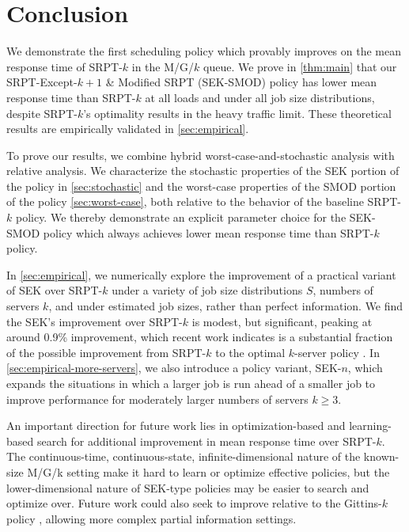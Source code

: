 \documentclass[acmsmall]{acmart}
\begin{document}
\section{Conclusion}

We demonstrate the first scheduling policy which provably improves
on the mean response time of SRPT-$k$ in the M/G/$k$ queue.
We prove in \cref{thm:main} that our SRPT-Except-$k+1$ \& Modified SRPT (SEK-SMOD) policy has lower mean response time than SRPT-$k$ at all loads and under all job size distributions,
despite SRPT-$k$'s optimality results in the heavy traffic limit.
These theoretical results are empirically validated in \cref{sec:empirical}.

To prove our results,
we combine hybrid worst-case-and-stochastic analysis with relative analysis.
We characterize the stochastic properties of the SEK portion of the policy in \cref{sec:stochastic}
and the worst-case properties of the SMOD portion of the policy \cref{sec:worst-case},
both relative to the behavior of the baseline SRPT-$k$ policy.
We thereby demonstrate an explicit parameter choice for the SEK-SMOD policy
which always achieves lower mean response time than SRPT-$k$ policy.

In \cref{sec:empirical}, we numerically explore the improvement of a practical variant of SEK over SRPT-$k$
under a variety of job size distributions $S$, numbers of servers $k$,
and under estimated job sizes, rather than perfect information.
We find the SEK's improvement over SRPT-$k$ is modest, but significant, peaking at around 0.9\% improvement,
which recent work indicates is a substantial fraction of the possible improvement from SRPT-$k$ to the optimal $k$-server policy \cite{wang-et-al2025novel}.
In \cref{sec:empirical-more-servers}, we also introduce a policy variant, SEK-$n$, which expands the situations in which a larger job is run ahead of a smaller job to improve performance for moderately larger numbers of servers $k \ge 3$.

An important direction for future work lies in optimization-based and learning-based search for additional improvement in mean response time over SRPT-$k$.
The continuous-time, continuous-state, infinite-dimensional nature of the known-size M/G/k setting make it hard to learn or optimize effective policies, but the lower-dimensional nature of SEK-type policies may be easier to search and optimize over.
Future work could also seek to improve relative to the Gittins-$k$ policy \cite{scully-et-al2020gittins},
allowing more complex partial information settings.
\end{document}
